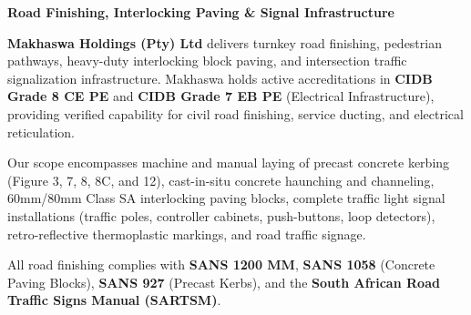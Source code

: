 \documentclass[a4paper,11pt]{article}
\begin{document}
\noindent
\begin{minipage}[t]{0.62\textwidth}
    \vspace{0pt}
    {\large\bfseries\color{mhnavy} Road Finishing, Interlocking Paving \& Signal Infrastructure}
    \vspace{0.12cm}

    {\fontsize{9pt}{13pt}\selectfont\color{mhtext}
    \textbf{Makhaswa Holdings (Pty) Ltd} delivers turnkey road finishing, pedestrian pathways, heavy-duty interlocking block paving, and intersection traffic signalization infrastructure. Makhaswa holds active accreditations in \textbf{CIDB Grade 8 CE PE} and \textbf{CIDB Grade 7 EB PE} (Electrical Infrastructure), providing verified capability for civil road finishing, service ducting, and electrical reticulation.
    }

    \vspace{0.22cm}

    {\fontsize{9pt}{13pt}\selectfont\color{mhtext}
    Our scope encompasses machine and manual laying of precast concrete kerbing (Figure 3, 7, 8, 8C, and 12), cast-in-situ concrete haunching and channeling, 60mm/80mm Class SA interlocking paving blocks, complete traffic light signal installations (traffic poles, controller cabinets, push-buttons, loop detectors), retro-reflective thermoplastic markings, and road traffic signage.
    }

    \vspace{0.22cm}

    {\fontsize{9pt}{13pt}\selectfont\color{mhtext}
    All road finishing complies with \textbf{SANS 1200 MM}, \textbf{SANS 1058} (Concrete Paving Blocks), \textbf{SANS 927} (Precast Kerbs), and the \textbf{South African Road Traffic Signs Manual (SARTSM)}.
    }
\end{minipage}
\hfill
\end{document}
